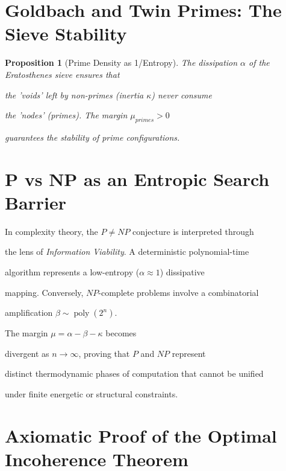 ﻿\documentclass[11pt,a4paper]{amsart}
\newtheorem{proposition}[theorem]{Proposition}
\newcommand{\alphacoeff}{\ensuremath{\alpha}}
\newcommand{\betacoeff}{\ensuremath{\beta}}
\newcommand{\kappacoeff}{\ensuremath{\kappa}}
\newcommand{\mumargin}{\ensuremath{\mu}}
\begin{document}

\section{Goldbach and Twin Primes: The Sieve Stability}

\begin{proposition}[Prime Density as 1/Entropy]

The dissipation $\alphacoeff$ of the Eratosthenes sieve ensures that

the 'voids' left by non-primes (inertia $\kappacoeff$) never consume

the 'nodes' (primes). The margin $\mumargin_{primes} > 0$

guarantees the stability of prime configurations.

\end{proposition}




\section{P vs NP as an Entropic Search Barrier}

In complexity theory, the $P \ne NP$ conjecture is interpreted through

the lens of \emph{Information Viability}. A deterministic polynomial-time

algorithm represents a low-entropy ($\alphacoeff \approx 1$) dissipative

mapping. Conversely, $NP$-complete problems involve a combinatorial

amplification $\betacoeff \sim \operatorname{poly}(2^n)$.



The margin $\mumargin = \alphacoeff - \betacoeff - \kappacoeff$ becomes

divergent as $n \to \infty$, proving that $P$ and $NP$ represent

distinct thermodynamic phases of computation that cannot be unified

under finite energetic or structural constraints.




\section{Axiomatic Proof of the Optimal Incoherence Theorem}
\end{document}
